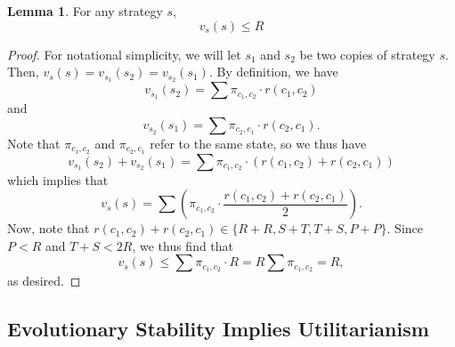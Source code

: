 \documentclass[11pt]{amsart}
\theoremstyle{definition}
\newtheorem{lemma}[theorem]{Lemma}
\theoremstyle{remark}
\begin{document}
\begin{lemma}
  \label{neverbetterthanr}
  For any strategy $s$,
  \begin{equation*}
    v_{s}(s) \leq R
  \end{equation*}
\end{lemma}
\begin{proof}
  For notational simplicity, we will let $s_1$ and $s_2$ be two copies of strategy $s$. Then, $v_{s}(s) = v_{s_1}(s_2) = v_{s_2}(s_1)$. By definition, we have
  \begin{equation*}
    v_{s_1}(s_2) = \sum \pi_{c_1,c_2} \cdot r(c_1,c_2)
  \end{equation*}
  and
  \begin{equation*}
    v_{s_2}(s_1) = \sum \pi_{c_2,c_1} \cdot r(c_2,c_1).
  \end{equation*}
  Note that $\pi_{c_1,c_2}$ and $\pi_{c_2,c_1}$ refer to the same state, so we thus have \begin{equation*}
    v_{s_1}(s_2) + v_{s_2}(s_1) = \sum \pi_{c_1,c_2} \cdot (r(c_1,c_2) + r(c_2,c_1))
  \end{equation*}
  which implies that \begin{equation*}
    v_s(s) = \sum \left( \pi_{c_1,c_2} \cdot \frac{r(c_1,c_2) + r(c_2,c_1)}{2} \right).
  \end{equation*}
  Now, note that $r(c_1,c_2) + r(c_2,c_1) \in \{R + R, S + T, T+S, P + P\}$. Since $P < R$ and $T + S < 2R$, we thus find that \begin{equation*}
    v_s(s) \leq \sum \pi_{c_1,c_2} \cdot R = R \sum \pi_{c_1,c_2} = R,
  \end{equation*}
  as desired.
\end{proof}

\subsection{Evolutionary Stability Implies Utilitarianism}
\end{document}
